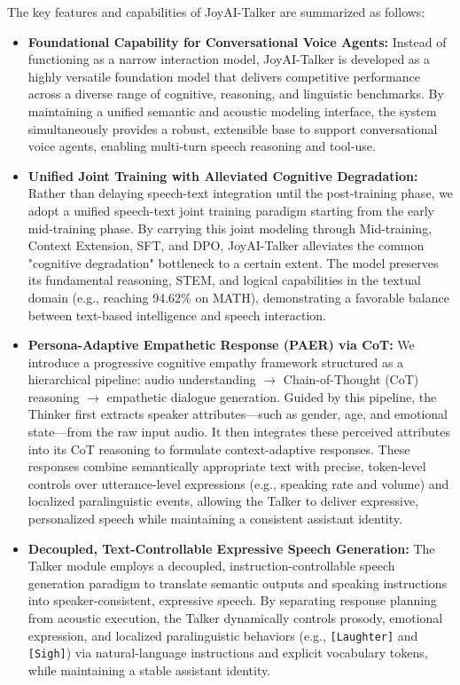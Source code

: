 The key features and capabilities of JoyAI-Talker are summarized as follows:

\begin{itemize}
    \item \textbf{Foundational Capability for Conversational Voice Agents:} 
    Instead of functioning as a narrow interaction model, JoyAI-Talker is developed as a highly versatile foundation model that delivers competitive performance across a diverse range of cognitive, reasoning, and linguistic benchmarks. By maintaining a unified semantic and acoustic modeling interface, the system simultaneously provides a robust, extensible base to support conversational voice agents, enabling multi-turn speech reasoning and tool-use.
    
    \item \textbf{Unified Joint Training with Alleviated Cognitive Degradation:} 
    Rather than delaying speech-text integration until the post-training phase, we adopt a unified speech-text joint training paradigm starting from the early mid-training phase. By carrying this joint modeling through Mid-training, Context Extension, SFT, and DPO, JoyAI-Talker alleviates the common "cognitive degradation" bottleneck to a certain extent. The model preserves its fundamental reasoning, STEM, and logical capabilities in the textual domain (e.g., reaching 94.62\% on MATH), demonstrating a favorable balance between text-based intelligence and speech interaction.
    
    \item \textbf{Persona-Adaptive Empathetic Response (PAER) via CoT:} 
    We introduce a progressive cognitive empathy framework structured as a hierarchical pipeline: audio understanding $\rightarrow$ Chain-of-Thought (CoT) reasoning $\rightarrow$ empathetic dialogue generation. Guided by this pipeline, the Thinker first extracts speaker attributes—such as gender, age, and emotional state—from the raw input audio. It then integrates these perceived attributes into its CoT reasoning to formulate context-adaptive responses. These responses combine semantically appropriate text with precise, token-level controls over utterance-level expressions (e.g., speaking rate and volume) and localized paralinguistic events, allowing the Talker to deliver expressive, personalized speech while maintaining a consistent assistant identity.
    
    \item \textbf{Decoupled, Text-Controllable Expressive Speech Generation:} 
    The Talker module employs a decoupled, instruction-controllable speech generation paradigm to translate semantic outputs and speaking instructions into speaker-consistent, expressive speech. By separating response planning from acoustic execution, the Talker dynamically controls prosody, emotional expression, and localized paralinguistic behaviors (e.g., \texttt{[Laughter]} and \texttt{[Sigh]}) via natural-language instructions and explicit vocabulary tokens, while maintaining a stable assistant identity.
    

\end{itemize}
